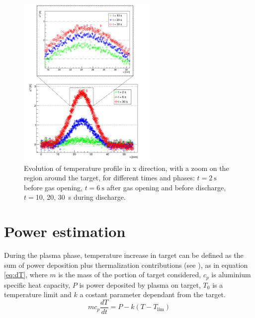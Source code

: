 \begin{figure}
 \centering
 \includegraphics[width=0.6\textwidth]{Images/Temperature/f5t4d4_profilo_tempi_zoom.png}
 \caption{Evolution of temperature profile in x direction, with a zoom on the region around the target, for different times and phases: $t = \SI{2}{\second}$ before gas opening, $t = \SI{6}{\second}$ after gas opening and before discharge, $t = $\num{10}, \num{20}, \SI{30}{\second} during discharge. }
 \label{fig:dis_profiles}
\end{figure}


\section{Power estimation}
During the plasma phase, temperature increase in target can be defined as the sum of power deposition plus thermalization contributions (see \cite{Pimazzoni2018}), as in equation \ref{eq:dT}, where $m$ is the mass of the portion of target considered, $c_p$ is aluminium specific heat capacity, $P$ is power deposited by plasma on target, $T_{0}$ is a temperature limit and $k$ a costant parameter dependant from the target.
\begin{equation}
 m c_p \frac{dT}{dt} = P - k(T-T_{\text{lim}})
 \label{eq:dT}
\end{equation}

